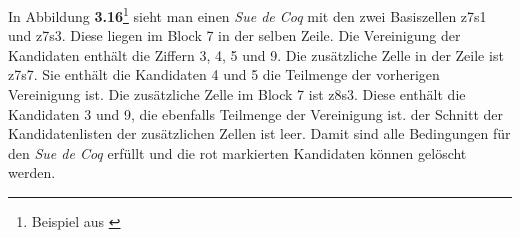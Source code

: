 \noindent In Abbildung \textbf{3.16}\footnote{Beispiel aus \cite{HDKSue}} sieht man einen \textit{Sue de Coq} mit den zwei Basiszellen z7s1 und z7s3. Diese liegen im Block 7 in der selben Zeile. Die Vereinigung der Kandidaten enthält die Ziffern 3, 4, 5 und 9. Die zusätzliche Zelle in der Zeile ist z7s7. Sie enthält die Kandidaten 4 und 5 die Teilmenge der vorherigen Vereinigung ist. Die zusätzliche Zelle im Block 7 ist z8s3. Diese enthält die Kandidaten 3 und 9, die ebenfalls Teilmenge der Vereinigung ist. der Schnitt der Kandidatenlisten der zusätzlichen Zellen ist leer. Damit sind alle Bedingungen für den \textit{Sue de Coq} erfüllt und die rot markierten Kandidaten können gelöscht werden.